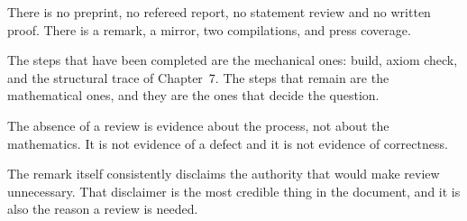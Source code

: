 \begin{keytakeaways}

\item There is no preprint, no refereed report, no statement review and no
written proof. There is a remark, a mirror, two compilations, and press
coverage.
\item The steps that have been completed are the mechanical ones: build, axiom
check, and the structural trace of Chapter~7. The steps that remain are the
mathematical ones, and they are the ones that decide the question.
\item The absence of a review is evidence about the process, not about the
mathematics. It is not evidence of a defect and it is not evidence of
correctness.
\item The remark itself consistently disclaims the authority that would make
review unnecessary. That disclaimer is the most credible thing in the
document, and it is also the reason a review is needed.
\end{keytakeaways}
